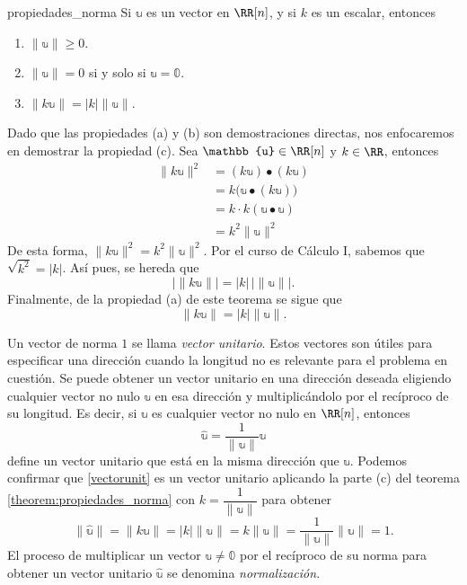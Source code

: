 \begin{theorem}{}{propiedades_norma}
    Si $\mathbb{u}$ es un vector en $\RR[n]$, y si $k$ es un escalar, entonces
    \begin{enumerate}[label=\alph*), topsep=6pt, itemsep=0pt]
        \item $\| \mathbb{u} \| \geq 0$.
        \item $\| \mathbb{u} \| = 0$ si y solo si $\mathbb{u} = \mathbb{0}$.
        \item $\| k \mathbb{u} \| = |k| \| \mathbb{u} \|$.
    \end{enumerate}

    \tcblower
    \demostracion Dado que las propiedades (a) y (b) son demostraciones directas, nos enfocaremos en demostrar la propiedad (c). Sea $\mathbb{u} \in \RR[n]$ y $k \in \RR$, entonces
    \begin{align*}
        \| k \mathbb{u} \|^2 & = (k \mathbb{u}) \bullet (k \mathbb{u}) \\
        & = k \big( \mathbb{u} \bullet (k \mathbb{u}) \big) \\
        & = k \cdot k (\mathbb{u} \bullet \mathbb{u}) \\
        & = k^2 \| \mathbb{u} \|^2
    \end{align*}
    De esta forma, $\| k \mathbb{u} \|^2 = k^2 \| \mathbb{u} \|^2$. Por el curso de Cálculo I, sabemos que $\sqrt{k^2} = |k|$. Así pues, se hereda que
    $$\big| \| k \mathbb{u} \| \big| = |k| \, \big| \| \mathbb{u} \| \big|.$$
    Finalmente, de la propiedad (a) de este teorema se sigue que
    $$\| k \mathbb{u} \| = |k| \| \mathbb{u} \|.$$
\end{theorem}

\newpage

Un vector de norma $1$ se llama \emph{vector unitario}. Estos vectores son útiles para especificar una dirección cuando la longitud no es relevante para el problema en cuestión. Se puede obtener un vector unitario en una dirección deseada eligiendo cualquier vector no nulo $\mathbb{u}$ en esa dirección y multiplicándolo por el recíproco de su longitud. Es decir, si $\mathbb{u}$ es cualquier vector no nulo en $\RR[n]$, entonces
\begin{equation}
    \hat{\mathbb{u}} = \frac{1}{\|\mathbb{u}\|} \mathbb{u} \label{vectorunit}
\end{equation}
define un vector unitario que está en la misma dirección que $\mathbb{u}$. Podemos confirmar que \eqref{vectorunit} es un vector unitario aplicando la parte (c) del teorema \ref{theorem:propiedades_norma} con $k = \dfrac{1}{\|\mathbb{u}\|}$ para obtener
$$\|\hat{\mathbb{u}}\| = \|k\mathbb{u}\| = |k| \|\mathbb{u}\| = k \|\mathbb{u}\| = \frac{1}{\|\mathbb{u}\|} \|\mathbb{u}\| = 1.$$
El proceso de multiplicar un vector $\mathbb{u} \neq \mathbb{0}$ por el recíproco de su norma para obtener un vector unitario $\hat{\mathbb{u}}$ se denomina \emph{normalización}.

